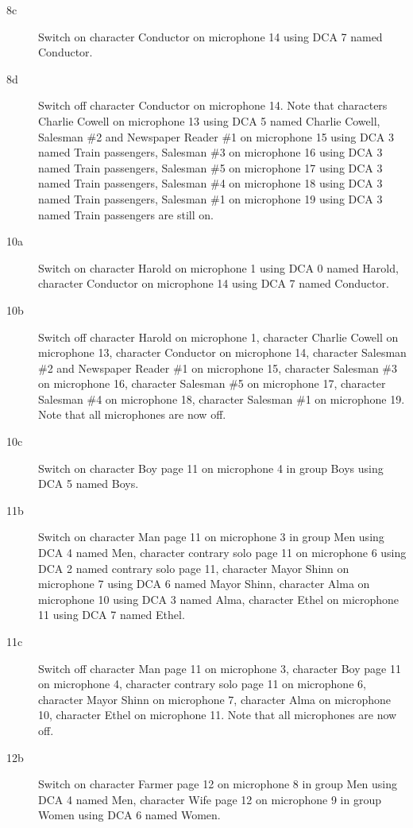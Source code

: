 \begin{description}
\item[8c]
Switch on character Conductor on microphone 14 using DCA 7 named Conductor. 

\item[8d]
Switch off character Conductor on microphone 14. Note that characters Charlie Cowell on microphone 13 using DCA 5 named Charlie Cowell, Salesman \#2 and Newspaper Reader \#1 on microphone 15 using DCA 3 named Train passengers, Salesman \#3 on microphone 16 using DCA 3 named Train passengers, Salesman \#5 on microphone 17 using DCA 3 named Train passengers, Salesman \#4 on microphone 18 using DCA 3 named Train passengers, Salesman \#1 on microphone 19 using DCA 3 named Train passengers are still on.  

\item[10a]
Switch on character Harold on microphone 1 using DCA 0 named Harold, character Conductor on microphone 14 using DCA 7 named Conductor. 

\item[10b]
Switch off character Harold on microphone 1, character Charlie Cowell on microphone 13, character Conductor on microphone 14, character Salesman \#2 and Newspaper Reader \#1 on microphone 15, character Salesman \#3 on microphone 16, character Salesman \#5 on microphone 17, character Salesman \#4 on microphone 18, character Salesman \#1 on microphone 19. Note that all microphones are now off.

\item[10c]
Switch on character Boy page 11 on microphone 4 in group Boys using DCA 5 named Boys. 

\item[11b]
Switch on character Man page 11 on microphone 3 in group Men using DCA 4 named Men, character contrary solo page 11 on microphone 6 using DCA 2 named contrary solo page 11, character Mayor Shinn on microphone 7 using DCA 6 named Mayor Shinn, character Alma on microphone 10 using DCA 3 named Alma, character Ethel on microphone 11 using DCA 7 named Ethel. 

\item[11c]
Switch off character Man page 11 on microphone 3, character Boy page 11 on microphone 4, character contrary solo page 11 on microphone 6, character Mayor Shinn on microphone 7, character Alma on microphone 10, character Ethel on microphone 11. Note that all microphones are now off.

\item[12b]
Switch on character Farmer page 12 on microphone 8 in group Men using DCA 4 named Men, character Wife page 12 on microphone 9 in group Women using DCA 6 named Women. 


\end{description}
